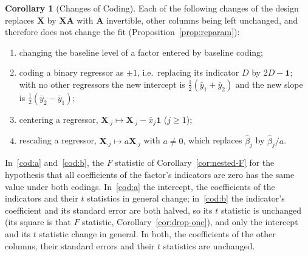 \documentclass[12pt,a4paper]{article}
\theoremstyle{definition}
\newtheorem{corollary}[theorem]{Corollary}
\newcommand{\bX}{\mathbf{X}}
\newcommand{\bone}{\mathbf{1}}
\newcommand{\bA}{\mathbf{A}}
\begin{document}
\begin{corollary}[Changes of Coding]\label{cor:coding}
Each of the following changes of the design replaces $\bX$ by $\bX\bA$ with $\bA$ invertible, other columns being left unchanged, and therefore does not change the fit (Proposition~\ref{prop:reparam}):
\begin{enumerate}[label=\textup{(\alph*)}]
\item\label{cod:a} changing the baseline level of a factor entered by baseline coding;
\item\label{cod:b} coding a binary regressor as $\pm 1$, i.e.\ replacing its indicator $D$ by $2D - \bone$; with no other regressors the new intercept is $\frac{1}{2}(\bar y_1 + \bar y_2)$ and the new slope is $\frac{1}{2}(\bar y_2 - \bar y_1)$;
\item centering a regressor, $\bX_{\cdot j} \mapsto \bX_{\cdot j} - \bar x_j\bone$ ($j \geqslant 1$);
\item rescaling a regressor, $\bX_{\cdot j} \mapsto a\bX_{\cdot j}$ with $a \neq 0$, which replaces $\hat\beta_j$ by $\hat\beta_j/a$.
\end{enumerate}
In~\ref{cod:a} and~\ref{cod:b}, the $F$ statistic of Corollary~\ref{cor:nested-F} for the hypothesis that all coefficients of the factor's indicators are zero has the same value under both codings. In~\ref{cod:a} the intercept, the coefficients of the indicators and their $t$ statistics in general change; in~\ref{cod:b} the indicator's coefficient and its standard error are both halved, so its $t$ statistic is unchanged (its square is that $F$ statistic, Corollary~\ref{cor:drop-one}), and only the intercept and its $t$ statistic change in general. In both, the coefficients of the other columns, their standard errors and their $t$ statistics are unchanged.
\end{corollary}
\end{document}

